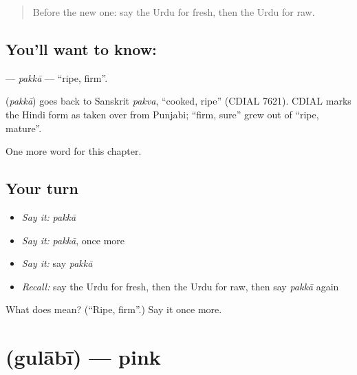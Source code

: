 \label{lesson:UR-C136-pakka}



\begin{quote}
Before the new one: say the Urdu for fresh, then the Urdu for raw.
\end{quote}

\subsection*{You'll want to know: }
\textbf{} — \emph{pakkā} — \textquotedblleft{}ripe, firm\textquotedblright{}.

\begin{cousinweb}
\textbf{} (\emph{pakkā}) goes back to Sanskrit \emph{pakva}, \textquotedblleft{}cooked, ripe\textquotedblright{} (CDIAL 7621). CDIAL marks the Hindi form as taken over from Punjabi; \textquotedblleft{}firm, sure\textquotedblright{} grew out of \textquotedblleft{}ripe, mature\textquotedblright{}.
\end{cousinweb}

\begin{grammarlens}[title={What you've built}]
One more word for this chapter.
\end{grammarlens}

\subsection*{Your turn}
\begin{itemize}
\raggedright
  \item \emph{Say it:} \emph{pakkā}
  \item \emph{Say it:} \emph{pakkā}, once more
  \item \emph{Say it:} say \emph{pakkā}
  \item \emph{Recall:} say the Urdu for fresh, then the Urdu for raw, then say \emph{pakkā} again
\end{itemize}

\begin{tcolorbox}[breakable,colback=teal!4,colframe=teal!35!black,title={Before you move on}]
What does  mean? (\textquotedblleft{}Ripe, firm\textquotedblright{}.) Say it once more.
\end{tcolorbox}
\section[\texorpdfstring{\ur{گلابی} (gulābī)}{گلابی (gulābī)}]{ (gulābī) — pink}

